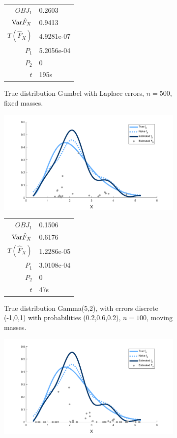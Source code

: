 \begin{figure}
\begin{subfigure}[b]{0.38\textwidth}
		\begin{tabular}{r l}
			$OBJ_1$ & 0.2603\\
			$\mathrm{Var} \hat{F}_X$ & 0.9413\\
			$T(\hat{F}_X)$ & 4.9281e-07\\
			$P_1$ & 5.2056e-04\\
			$P_2$ & 0\\
			$t$ & 195s
		\end{tabular}
		\caption{True distribution Gumbel with Laplace errors, $n = 500$, fixed masses.}
		\label{fig:fixed masses gumbel lap}
	\end{subfigure}
	\begin{subfigure}[b]{0.38\textwidth}
		\centering
		\includegraphics[width = \textwidth]{Figures/Deconvolution/moving_masses_gamma_discrete_n100_example.png}
		\begin{tabular}{r l}
			$OBJ_1$ & 0.1506\\
			$\mathrm{Var} \hat{F}_X$ & 0.6176\\
			$T(\hat{F}_X)$ & 1.2286e-05\\
			$P_1$ & 3.0108e-04\\
			$P_2$ & 0\\
			$t$ & 47s
		\end{tabular}
		\caption{True distribution Gamma(5,2), with errors discrete (-1,0,1) with probabilities (0.2,0.6,0.2), $n = 100$, moving masses.}
		\label{fig:moving masses gamma discrete}
	\end{subfigure}
	\hfill
	\begin{subfigure}[b]{0.38\textwidth}
		\centering
		\includegraphics[width = \textwidth]{Figures/Deconvolution/fixed_masses_gamma_discrete_n100_example.png}

\end{subfigure}
\end{figure}
